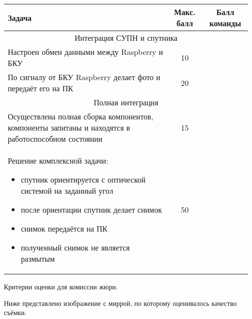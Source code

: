 \begin{table}[H]
    \begin{center}
        \begin{tabular}{|p{8cm}|c|c|}
            \hline
            Задача & Макс. балл & Балл команды \\
            \hline
            \multicolumn{3}{|c|}{Интеграция СУПН и спутника} \\
            \hline
            Настроен обмен данными между Raspberry и БКУ&	10& \\
            \hline
            По сигналу от БКУ Raspberry делает фото и передаёт его на ПК&	20	& \\
            \hline
            \multicolumn{3}{|c|}{Полная интеграция} \\
            \hline
            Осуществлена полная сборка компонентов, компоненты запитаны и находятся в работоспособном состоянии	&15& \\
            \hline
            Решение комплексной задачи:
            \begin{itemize}
                \item спутник ориентируется с оптической системой на заданный угол
                \item после ориентации спутник делает снимок
                \item снимок передаётся на ПК
                \item полученный снимок не является размытым
            \end{itemize}	& 50 & \\
            \hline	
        \end{tabular}
    \end{center}
\end{table}

Критерии оценки для комиссии жюри.


Ниже представлено изображение с миррой, по которому оценивалось качество съёмки.

